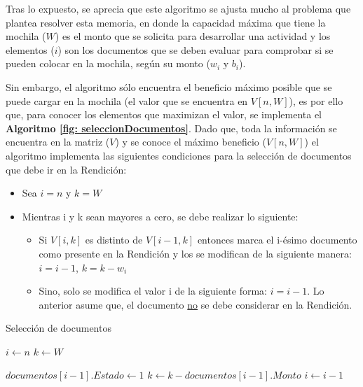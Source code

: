 Tras lo expuesto, se aprecia que este algoritmo se ajusta mucho al problema que plantea resolver esta memoria, en donde la capacidad máxima que tiene la mochila ($W$) es el monto que se solicita para desarrollar una actividad y los elementos ($i$) son los documentos que se deben evaluar para comprobar si se pueden colocar en la mochila, según su monto ($w_i$ y $b_i$).

Sin embargo, el algoritmo sólo encuentra el beneficio máximo posible que se puede cargar en la mochila (el valor que se encuentra en $V[n,W]$), es por ello que, para conocer los elementos  que maximizan el valor, se implementa el \textbf{Algoritmo \ref{fig: seleccionDocumentos}}. Dado que, toda la información se encuentra en la matriz ($V$) y se conoce el máximo beneficio ($V[n,W]$) el algoritmo implementa las siguientes condiciones para la selección de documentos que debe ir en la Rendición:


\begin{itemize}
    \item Sea $i=n$ y $k=W$
    \item Mientras i y k sean mayores a cero, se debe realizar lo siguiente:
    \begin{itemize}
        \item Si $V[i,k]$ es distinto de $V[i-1,k]$ entonces marca el i-ésimo documento como presente en la Rendición y los se modifican de la siguiente manera: $i=i-1$, $k=k-w_i$
        \item Sino, solo se modifica el valor i de la siguiente forma: $i=i-1$. Lo anterior asume que, el documento \underline{no} se debe considerar en la Rendición.
    \end{itemize}
    
\end{itemize}


\begin{algorithm}
    \caption{\label{fig: seleccionDocumentos}Selección de documentos}
    \begin{algorithmic}[1]


    \vspace{3mm}
    \State $i \gets n$
    \State $k \gets W$

    \vspace{3mm}
            \State $documentos[i - 1].Estado \gets 1$
            \State $k \gets k - documentos[i - 1].Monto$
        \EndIf
        \State $i \gets i - 1$
    \EndWhile
  \end{algorithmic}
\end{algorithm}